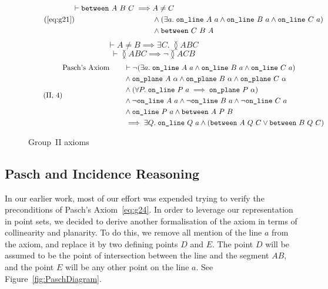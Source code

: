 \begin{figure}
\begin{equation}
 \tag{\ref{eq:g21}}
  \begin{split}
    \vdash\between{A}{B}{C} \implies & A \neq C\\
                               & \wedge (\exists a.\; \code{on\_line}\ A\ a \wedge \code{on\_line}\ B\ a \wedge \code{on\_line}\ C\ a)\\
                               & \wedge \between{C}{B}{A}
  \end{split}
\end{equation}
\begin{equation}\label{eq:g22}
  \tag{II,~2}
  \vdash A \neq B \implies \exists C.\; \between{A}{B}{C}
\end{equation}
\begin{equation}\label{eq:g23}
  \tag{II,~3}
  \vdash\between{A}{B}{C} \implies \neg\between{A}{C}{B}
\end{equation}
\begin{equation}\label{eq:g24}
  \tag{II,~4}
  \begin{split}
    \text{Pasch's Axiom}\qquad & \vdash\neg(\exists a.\; \texttt{on\_line}\ A\ a\wedge \texttt{on\_line}\ B\ a\wedge \texttt{on\_line}\ C\ a)\\
    & \wedge \texttt{on\_plane}\ A\ \alpha \wedge \texttt{on\_plane}\ B\ \alpha \wedge \texttt{on\_plane}\ C\ \alpha \\
    & \wedge (\forall P.\; \texttt{on\_line}\ P\ a \implies \texttt{on\_plane}\ P\ \alpha)\\
    & \wedge \neg\texttt{on\_line}\ A\ a \wedge \neg\texttt{on\_line}\ B\ a \wedge \neg\texttt{on\_line}\ C\ a\\
    & \wedge \texttt{on\_line}\ P\ a \wedge \texttt{between}\ A\ P\ B\\
    & \implies \exists Q.\; \texttt{on\_line}\ Q\ a \wedge (\texttt{between}\ A\ Q\ C \vee \texttt{between}\ B\ Q\ C)
  \end{split}
\end{equation}
\caption{Group~II axioms}
\label{fig:Group2Axioms}
\end{figure}

\subsection{Pasch and Incidence Reasoning}
In our earlier work, most of our effort was expended trying to verify the preconditions of Pasch's Axiom~\eqref{eq:g24}. In order to leverage our representation in point sets, we decided to derive another formalisation of the axiom in terms of collinearity and planarity. To do this, we remove all mention of the line $a$ from the axiom, and replace it by two defining points $D$ and $E$. The point $D$ will be assumed to be the point of intersection between the line and the segment $AB$, and the point $E$ will be any other point on the line $a$. See Figure~\ref{fig:PaschDiagram}.


